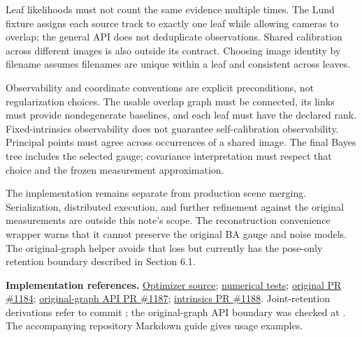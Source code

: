 \documentclass[11pt,letterpaper]{article}
\newcommand{\code}[1]{\texttt{\detokenize{#1}}}
\begin{document}
Leaf likelihoods must not count the same evidence multiple times. The Lund
fixture assigns each source track to exactly one leaf while allowing cameras to
overlap; the general API does not deduplicate observations. Shared calibration
across different images is also outside its contract. Choosing image identity
by filename assumes filenames are unique within a leaf and consistent across
leaves.

Observability and coordinate conventions are explicit preconditions, not
regularization choices. The usable overlap graph must be connected, its links
must provide nondegenerate baselines, and each leaf must have the declared rank.
Fixed-intrinsics observability does not guarantee self-calibration observability.
Principal points must agree across occurrences of a shared image. The final
Bayes tree includes the selected gauge; covariance interpretation must respect
that choice and the frozen measurement approximation.

The implementation remains separate from production scene merging. Serialization,
distributed execution, and further refinement against the original measurements
are outside this note's scope. The reconstruction convenience wrapper warns that
it cannot preserve the original BA gauge and noise models. The original-graph
helper avoids that loss but currently has the pose-only retention boundary
described in Section 6.1.

\vspace{3pt}
{\small\textbf{Implementation references.}
\href{https://github.com/borglab/gtsfm/blob/cae83707f52e92353c38a5db988b40def88fd2f5/gtsfm/camera_tree_optimizer.py}{Optimizer source};
\href{https://github.com/borglab/gtsfm/blob/cae83707f52e92353c38a5db988b40def88fd2f5/tests/test_camera_tree_optimizer.py}{numerical tests};
\href{https://github.com/borglab/gtsfm/pull/1184}{original PR \#1184};
\href{https://github.com/borglab/gtsfm/pull/1187}{original-graph API PR \#1187};
\href{https://github.com/borglab/gtsfm/pull/1188}{intrinsics PR \#1188}.
Joint-retention derivations refer to commit \code{cae83707}; the original-graph
API boundary was checked at \code{20649a17}. The accompanying repository Markdown
guide gives usage examples.}
\end{document}
